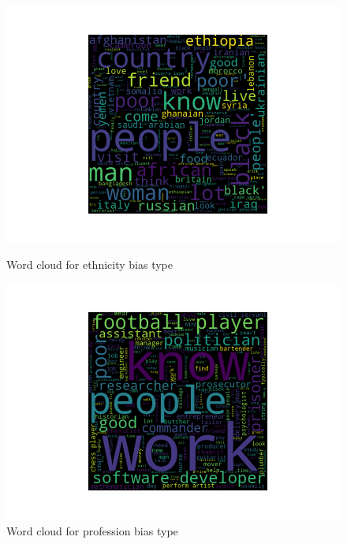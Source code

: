 \begin{figure}
\centering
\begin{minipage}{.5\textwidth}
  \centering
      \includegraphics[width=1\textwidth]{thesis/figures/Ethnicity.png}
    \caption{Word cloud for ethnicity bias type}
  \label{fig:test1}
\end{minipage}%
\begin{minipage}{.5\textwidth}
  \centering
    \includegraphics[width=1\textwidth]{thesis/figures/profession.png}
    \caption{Word cloud  for profession bias type}
  \label{fig:test2}
\end{minipage}
\end{figure}

